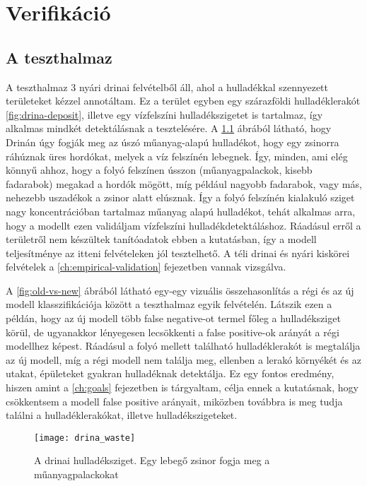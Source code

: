 \chapter {Verifikáció}
\label{ch:verification}

\section{A teszthalmaz}
\label{ch:test-set}

A teszthalmaz 3 nyári drinai felvételből áll, ahol a hulladékkal szennyezett területeket kézzel annotáltam. Ez a terület egyben egy szárazföldi hulladéklerakót \ref{fig:drina-deposit}, illetve egy vízfelszíni hulladékszigetet is tartalmaz, így alkalmas mindkét detektálásnak a tesztelésére. A \ref{fig:drina-floating-waste} ábrából látható, hogy Drinán úgy fogják meg az úszó műanyag-alapú hulladékot, hogy egy zsinorra ráhúznak üres hordókat, melyek a víz felszínén lebegnek. Így, minden, ami elég könnyű ahhoz, hogy a folyó felszínen ússzon (műanyagpalackok, kisebb fadarabok) megakad a hordók mögött, míg például nagyobb fadarabok, vagy más, nehezebb uszadékok a zsinor alatt elúsznak. Így a folyó felszínén kialakuló sziget nagy koncentrációban tartalmaz műanyag alapú hulladékot, tehát alkalmas arra, hogy a modellt ezen validáljam vízfelszíni hulladékdetektáláshoz. Ráadásul erről a területről nem készültek tanítóadatok ebben a kutatásban, így a modell teljesítménye az itteni felvételeken jól tesztelhető. A téli drinai és nyári kiskörei felvételek a \ref{ch:empirical-validation} fejezetben vannak vizsgálva.

A \ref{fig:old-vs-new} ábrából látható egy-egy vizuális összehasonlítás a régi és az új modell klasszifikációja között a teszthalmaz egyik felvételén. Látszik ezen a példán, hogy az új modell több false negative-ot termel főleg a hulladéksziget körül, de ugyanakkor lényegesen lecsökkenti a false positive-ok arányát a régi modellhez képest. Ráadásul a folyó mellett található hulladéklerakót is megtalálja az új modell, míg a régi modell nem találja meg, ellenben a lerakó környékét és az utakat, épületeket gyakran hulladéknak detektálja. Ez egy fontos eredmény, hiszen amint a \ref{ch:goals} fejezetben is tárgyaltam, célja ennek a kutatásnak, hogy csökkentsem a modell false positive arányait, miközben továbbra is meg tudja találni a hulladéklerakókat, illetve hulladékszigeteket.

\begin{figure}[H]
	\centering
	\texttt{[image: drina\_waste]}
	\caption{A drinai hulladéksziget. Egy lebegő zsinor fogja meg a műanyagpalackokat \cite{euronews2024}}
    \label{fig:drina-floating-waste}
\end{figure}

